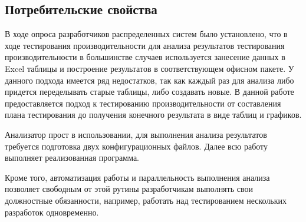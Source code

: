 \subsection{Потребительские свойства}
	В ходе опроса разработчиков распределенных систем было установлено, что в ходе тестирования производительности для анализа результатов тестирования производительности в большинстве случаев используется занесение данных в Excel таблицы и построение результатов в соответствующем офисном пакете. У данного подхода имеется ряд недостатков, так как каждый раз для анализа либо придется переделывать старые таблицы, либо создавать новые. В данной работе предоставляется подход к тестированию производительности от составления плана тестирования до получения конечного результата в виде таблиц и графиков.
	
	Анализатор прост в использовании, для выполнения анализа результатов требуется подготовка двух конфигурационных файлов. Далее всю работу выполняет реализованная программа.
	
	Кроме того, автоматизация работы и параллельность выполнения анализа позволяет свободным от этой рутины разработчикам выполнять свои должностные обязанности, например, работать над тестированием нескольких разработок одновременно.

